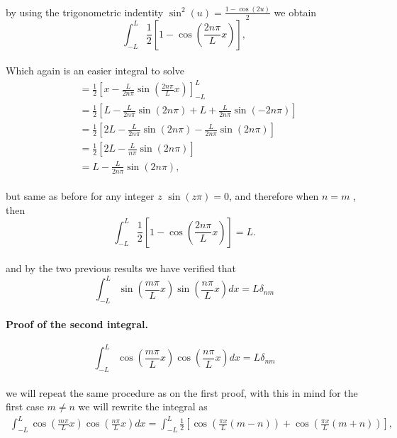 \documentclass{article}
\begin{document}
\paragraph{} by using the trigonometric indentity $\sin^2(u) = \frac{1 - \cos(2u)}{2}$ we obtain
$$\int_{-L}^{L} \frac{1}{2} \left[ 1 - \cos \left(\frac{2n\pi}{L} x \right) \right],$$
\paragraph{} Which again is an easier integral to solve
\begin{align*}
&= \frac{1}{2} \left[ x - \frac{L}{2n\pi} \sin \left(\frac{2n\pi}{L} x\right) \right]_{-L}^{L}\\
&= \frac{1}{2} \left[ L - \frac{L}{2n\pi} \sin (2n\pi) + L + \frac{L}{2n\pi} \sin (-2n\pi) \right]\\
&= \frac{1}{2} \left[ 2L - \frac{L}{2n\pi} \sin (2n\pi) - \frac{L}{2n\pi} \sin (2n\pi) \right]\\
&= \frac{1}{2} \left[ 2L - \frac{L}{n\pi} \sin (2n\pi) \right]\\
&= L - \frac{L}{2n\pi} \sin (2n\pi),
\end{align*}
\paragraph{} but same as before for any integer $z$ $\sin (z\pi) = 0$, and therefore when $n = m$ , then
$$\int_{-L}^{L} \frac{1}{2} \left[ 1 - \cos \left(\frac{2n\pi}{L} x \right) \right] = L.$$
\paragraph{} and by the two previous results we have verified that
$$\int_{-L}^{L} \sin \left(\frac{m\pi}{L} x\right) \sin \left(\frac{n\pi}{L} x\right) dx = L\delta_{nm}$$
\paragraph{Proof of the second integral.}
$$\int_{-L}^{L} \cos \left(\frac{m\pi}{L} x\right) \cos \left(\frac{n\pi}{L} x\right) dx = L\delta_{nm}$$
\paragraph{} we will repeat the same procedure as on the first proof,  with this in mind for the first case $m \neq n$ we will rewrite the integral as
\begin{align*}
\int_{-L}^{L} \cos \left(\frac{m\pi}{L} x\right) \cos \left(\frac{n\pi}{L} x\right) dx = \int_{-L}^{L} \frac{1}{2} \left[ \cos\left(\frac{\pi x}{L} (m - n)\right) + \cos\left(\frac{\pi x}{L} (m + n)\right)\right],
\end{align*}
\end{document}
